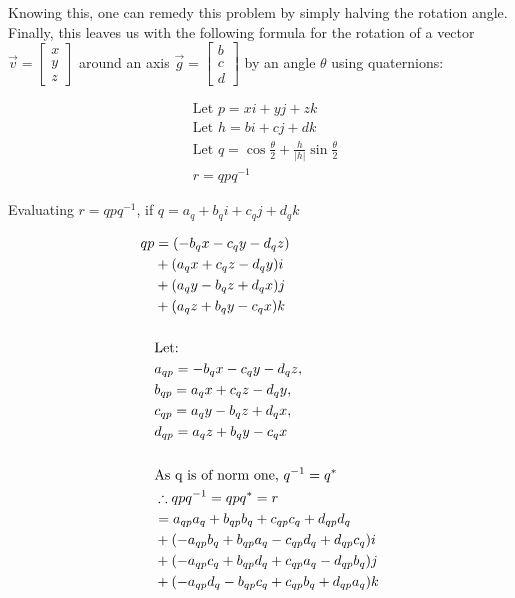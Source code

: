 \documentclass[12pt, a4paper]{article}
\begin{document}
Knowing this, one can remedy this problem by simply halving the rotation angle.
Finally, this leaves us with the following formula for the rotation of a vector
$\vec{v} = \begin{bmatrix} x \\
    y \\
    z
\end{bmatrix}$ around an axis $\vec{g} = \begin{bmatrix}
    b \\
    c \\
    d
\end{bmatrix}$ by an angle $\theta$ using quaternions:

\begin{align*}
    &\text{Let } p = xi + yj + zk \\
    &\text{Let } h = bi + cj + dk \\
    &\text{Let } q = \cos\frac{\theta}{2} + \frac{h}{|h|}\sin\frac{\theta}{2} \\
    &r = qpq^{-1}
\end{align*}

Evaluating $r = qpq^{-1}$, if $q = a_q + b_qi + c_qj + d_qk$

\begin{align*}
    qp     & = (- b_qx - c_qy - d_qz)                \\
           & + (a_qx + c_qz - d_qy)i               \\
           & + (a_qy - b_qz + d_qx)j               \\
           & + (a_qz + b_qy - c_qx )k               \\ \\
           & \text{Let:\space}                                    \\
           &a_{qp} =- b_qx - c_qy - d_qz,                 \\
           &b_{qp} = a_qx + c_qz - d_qy,                 \\
           &c_{qp} = a_qy - b_qz + d_qx,                 \\
           &d_{qp} = a_qz + b_qy - c_qx                  \\
    \\
           & \text{As q is of norm one, } q^{-1} = q^*            \\
           & \therefore qpq^{-1} = qpq^* = r                      \\
           & = a_{qp}a_q + b_{qp}b_q + c_{qp}c_q + d_{qp}d_q      \\
           & + (- a_{qp}b_q + b_{qp}a_q - c_{qp}d_q + d_{qp}c_q)i \\
           & + (- a_{qp}c_q + b_{qp}d_q + c_{qp}a_q - d_{qp}b_q)j \\
           & + (- a_{qp}d_q - b_{qp}c_q + c_{qp}b_q + d_{qp}a_q)k \\
\end{align*}
\end{document}

